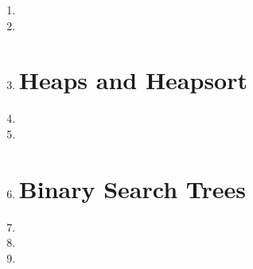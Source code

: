 \documentclass[11pt]{article}
\begin{document}
\begin{enumerate}
	\item 

	\item 
      
\newpage
	\item 

\section*{Heaps and Heapsort}
	\item 

	\item 

	\item 

\section*{Binary Search Trees}

	\item 
	
\pagebreak
	\item 

	\item 

\end{enumerate}
\end{document}
